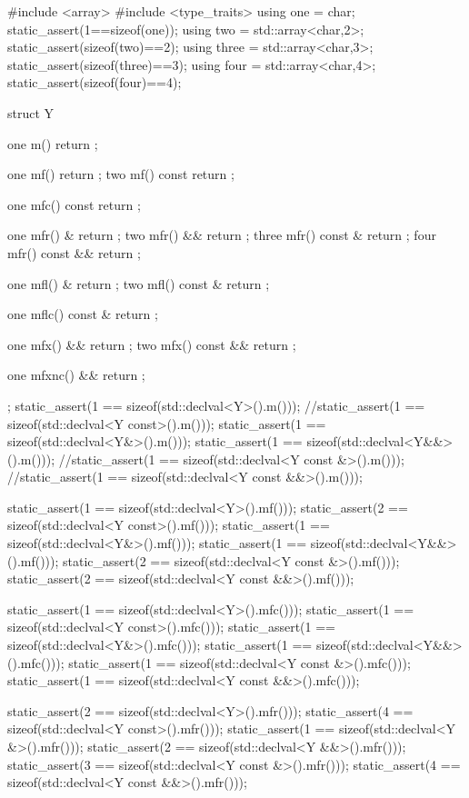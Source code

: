 \documentclass[ebook,11pt,article]{memoir}
\begin{document}
\begin{codeblock}
#include <array>
#include <type_traits>
using one = char;
static_assert(1==sizeof(one));
using two = std::array<char,2>;
static_assert(sizeof(two)==2);
using three = std::array<char,3>;
static_assert(sizeof(three)==3);
using four = std::array<char,4>;
static_assert(sizeof(four)==4);

struct Y{
	one m() { return {};}

	one
	mf() { return {};}
	two mf() const { return {};}

	one mfc() const { return {};}

    one mfr() & { return {};}
    two mfr() && { return {};}
    three mfr() const & { return {};}
    four mfr() const && { return {};}

    one mfl() & { return {};}
    two mfl() const & { return {};}

    one mflc() const & { return {};}

    one mfx() && { return {};}
    two mfx() const && { return {};}

    one mfxnc() && { return {};}

};
static_assert(1 == sizeof(std::declval<Y>().m()));
//static_assert(1 == sizeof(std::declval<Y const>().m()));
static_assert(1 == sizeof(std::declval<Y&>().m()));
static_assert(1 == sizeof(std::declval<Y&&>().m()));
//static_assert(1 == sizeof(std::declval<Y const \&>().m()));
//static_assert(1 == sizeof(std::declval<Y const \&\&>().m()));


static_assert(1 == sizeof(std::declval<Y>().mf()));
static_assert(2 == sizeof(std::declval<Y const>().mf()));
static_assert(1 == sizeof(std::declval<Y&>().mf()));
static_assert(1 == sizeof(std::declval<Y&&>().mf()));
static_assert(2 == sizeof(std::declval<Y const &>().mf()));
static_assert(2 == sizeof(std::declval<Y const &&>().mf()));

static_assert(1 == sizeof(std::declval<Y>().mfc()));
static_assert(1 == sizeof(std::declval<Y const>().mfc()));
static_assert(1 == sizeof(std::declval<Y&>().mfc()));
static_assert(1 == sizeof(std::declval<Y&&>().mfc()));
static_assert(1 == sizeof(std::declval<Y const &>().mfc()));
static_assert(1 == sizeof(std::declval<Y const &&>().mfc()));


static_assert(2 == sizeof(std::declval<Y>().mfr()));
static_assert(4 == sizeof(std::declval<Y const>().mfr()));
static_assert(1 == sizeof(std::declval<Y &>().mfr()));
static_assert(2 == sizeof(std::declval<Y &&>().mfr()));
static_assert(3 == sizeof(std::declval<Y const &>().mfr()));
static_assert(4 == sizeof(std::declval<Y const &&>().mfr()));


\end{codeblock}
\end{document}
